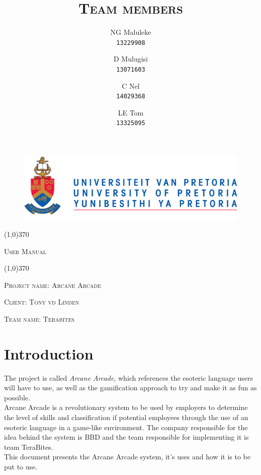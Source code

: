\documentclass[english]{article}
\title{\scshape\Large Team members}
\author{
	NG Maluleke\\
	\texttt{13229908}
	\and
	D Mulugisi\\
	\texttt{13071603}
	\and
	C Nel\\
	\texttt{14029368}
	\and
	LE Tom\\
	\texttt{13325095}
}
\begin{document}
	
	\begin{figure}
		\includegraphics[width=\linewidth]{up_logo.png}
	\end{figure}
	
	\begin{center}
	 \line(1,0){370}
	\\[0.2cm]
    {\scshape\Large User Manual \par}
	\vspace{0.1cm}
	\line(1,0){370}
	\\[0.8cm]
	
	{\scshape\large Project name: Arcane Arcade\par}	
	\vspace{1cm}
	{\scshape\large Client: Tony vd Linden\par}
	\vspace{1cm}
	{\scshape\large Team name: Terabites\par}
	\vspace{1cm}
	{\let\newpage\relax\maketitle}
	\end{center}
	
	
	\newpage
	\tableofcontents

	\newpage
	
	\section{Introduction}
		 The project is called \textit{Arcane Arcade}, which references the esoteric language users will have to use, as well as the gamification approach to try and make it as fun as possible.
		 \\[12pt]
		 Arcane Arcade is a revolutionary system to be used by employers to determine the level of skills and classification if potential employees through the use of an esoteric language in a game-like environment. The company responsible for the idea behind the system is BBD and the team responsible for implementing it is team TeraBites. 
		 \\[12pt]
		 This document presents the Arcane Arcade system, it's uses and how it is to be put to use.
\end{document}
